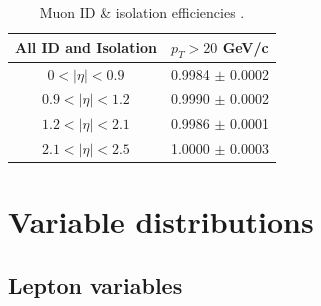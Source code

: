 \documentclass[oneside, a4paper, 11pt, ]{report}
\begin{document}
\begin{table} 
\begin{center}
\begin{tabular}{|c|c|}
\hline
	\textbf{All ID and Isolation} & $p_T > 20$ GeV/c \\
\hline	
	$0 < |\eta| < 0.9$ & 0.9984 $\pm$ 0.0002 \\
	$0.9 < |\eta| < 1.2$ & 0.9990 $\pm$ 0.0002 \\
	$1.2 < |\eta| < 2.1$ & 0.9986 $\pm$ 0.0001 \\
	$2.1 < |\eta| < 2.5$ & 1.0000 $\pm$ 0.0003 \\
\hline	
\end{tabular}
\end{center}
\caption{Muon ID \& isolation efficiencies \cite{MuonEfficiencies}.}
\label{tab-MuonEfficiencies}
\end{table}

\section{Variable distributions}

\subsection{Lepton variables}
\end{document}
